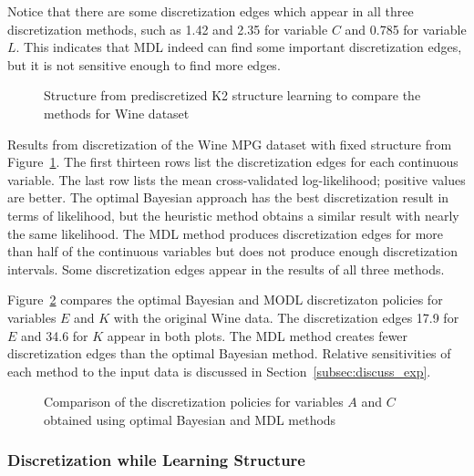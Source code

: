 Notice that there are some discretization edges which appear in all three discretization methods, such as \num{1.42} and \num{2.35} for variable $C$ and \num{0.785} for variable $L$.
This indicates that MDL indeed can find some important discretization edges, but it is not sensitive enough to find more edges.

\begin{figure}[ht]
  \centering
  \scalebox{0.8}{}
  \caption{Structure from prediscretized K2 structure learning to compare the methods for Wine dataset}
  \label{fig:wine_graph_1}
\end{figure}

\begin{table}
  \centering
  \caption{
    Results from discretization of the Wine MPG dataset with fixed structure from Figure~\ref{fig:wine_graph_1}.
    The first thirteen rows list the discretization edges for each continuous variable.
    The last row lists the mean cross-validated log-likelihood; positive values are better.
    The optimal Bayesian approach has the best discretization result in terms of likelihood, but the heuristic method obtains a similar result with nearly the same likelihood.
    The MDL method produces discretization edges for more than half of the continuous variables but does not produce enough discretization intervals.
    Some discretization edges appear in the results of all three methods.
  }
  \scalebox{1.0}{
  
  }
  \label{table:wine_disc_table_1}
\end{table}

Figure~\ref{fig:wine_exp1_distr} compares the optimal Bayesian and MODL discretizaton policies for variables $E$ and $K$ with the original Wine data.
The discretization edges \num{17.9} for $E$ and \num{34.6} for $K$ appear in both plots.
The MDL method creates fewer discretization edges than the optimal Bayesian method.
Relative sensitivities of each method to the input data is discussed in Section~\ref{subsec:discuss_exp}.

\begin{figure}[ht]
  \centering
  
  \caption{Comparison of the discretization policies for variables $A$ and $C$ obtained using optimal Bayesian and MDL methods}
  \label{fig:wine_exp1_distr}
\end{figure}

\subsubsection{Discretization while Learning Structure}
\label{subsubsec:wine_exp2}

